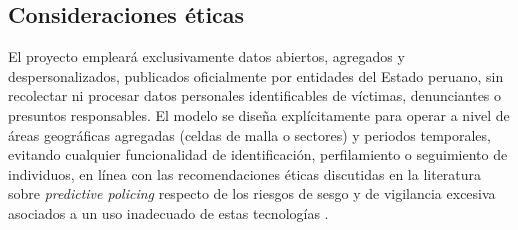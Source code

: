 \documentclass[12pt,letterpaper]{report}
\begin{document}
\subsection{Consideraciones \'eticas}
El proyecto emplear\'a exclusivamente datos abiertos, agregados y despersonalizados, publicados oficialmente por entidades del Estado peruano, sin recolectar ni procesar datos personales identificables de v\'ictimas, denunciantes o presuntos responsables. El modelo se dise\~na expl\'icitamente para operar a nivel de \'areas geogr\'aficas agregadas (celdas de malla o sectores) y periodos temporales, evitando cualquier funcionalidad de identificaci\'on, perfilamiento o seguimiento de individuos, en l\'inea con las recomendaciones \'eticas discutidas en la literatura sobre \textit{predictive policing} respecto de los riesgos de sesgo y de vigilancia excesiva asociados a un uso inadecuado de estas tecnolog\'ias \citep{perry2013predictive}.

\newpage


\newpage


\newpage
\end{document}
